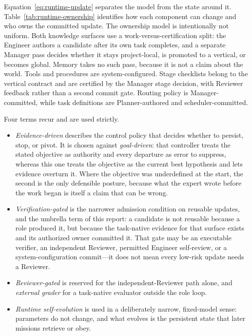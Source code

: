 Equation~\ref{eq:runtime-update} separates the model from the state around it.
Table~\ref{tab:runtime-ownership} identifies how each component can change and who
owns the committed update. The ownership model is intentionally not uniform. Both
knowledge surfaces use a work-versus-certification split: the Engineer authors a
candidate after its own task completes, and a separate Manager pass decides whether
it stays project-local, is promoted to a vertical, or becomes global. Memory takes no
such pass, because it is not a claim about the world. Tools and procedures are
system-configured. Stage checklists belong to the vertical contract and are certified
by the Manager stage decision, with Reviewer feedback rather than a second commit
gate. Routing policy is Manager-committed, while task
definitions are Planner-authored and scheduler-committed.

Four terms recur and are used strictly.

\begin{itemize}[leftmargin=1.3em,itemsep=2pt]
  \item \emph{Evidence-driven} describes the control policy that decides whether to
    persist, stop, or pivot. It is chosen against \emph{goal-driven}: that
    controller treats the stated objective as authority and every departure as error
    to suppress, whereas this one treats the objective as the current best hypothesis
    and lets evidence overturn it. Where the objective was underdefined at the start,
    the second is the only defensible posture, because what the expert wrote before
    the work began is itself a claim that can be wrong.
  \item \emph{Verification-gated} is the narrower admission condition on reusable
    updates, and the umbrella term of this report: a candidate is not reusable
    because a role produced it, but because the task-native evidence for that surface
    exists and its authorized owner committed it. That gate may be an executable
    verifier, an independent Reviewer, permitted Engineer self-review, or a
    system-configuration commit---it does not mean every low-risk update needs a
    Reviewer.
  \item \emph{Reviewer-gated} is reserved for the independent-Reviewer path alone,
    and \emph{external grader} for a task-native evaluator outside the role loop.
  \item \emph{Runtime self-evolution} is used in a deliberately narrow, fixed-model
    sense: parameters do not change, and what evolves is the persistent state that
    later missions retrieve or obey.
\end{itemize}

